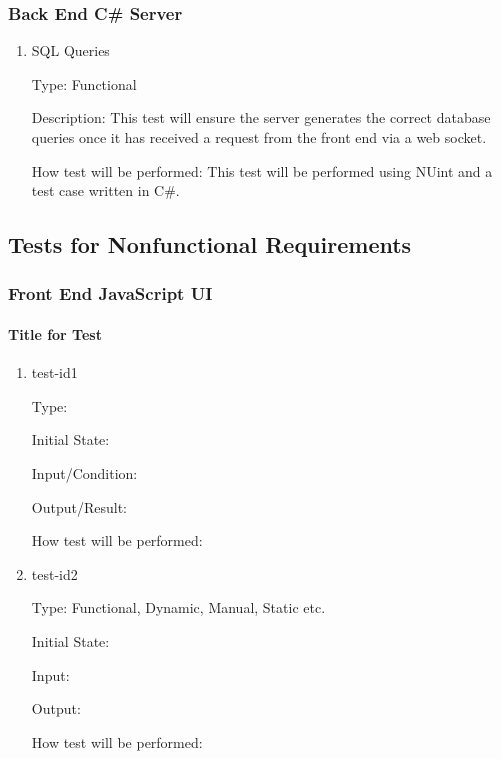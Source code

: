 \documentclass[12pt, titlepage]{article}
\begin{document}
\subsubsection{Back End C\# Server}

\begin{enumerate}

\item{SQL Queries\\}

Type: Functional
					
Description: This test will ensure the server generates the correct database
queries once it has received a request from the front end via a web socket.

How test will be performed: This test will be performed using NUint and a test
case written in C\#.

\end{enumerate}

\subsection{Tests for Nonfunctional Requirements}

\subsubsection{Front End JavaScript UI}
		
\paragraph{Title for Test}

\begin{enumerate}

\item{test-id1\\}

Type: 
					
Initial State: 
					
Input/Condition: 
					
Output/Result: 
					
How test will be performed: 
					
\item{test-id2\\}

Type: Functional, Dynamic, Manual, Static etc.
					
Initial State: 
					
Input: 
					
Output: 
					
How test will be performed: 

\end{enumerate}
\end{document}
